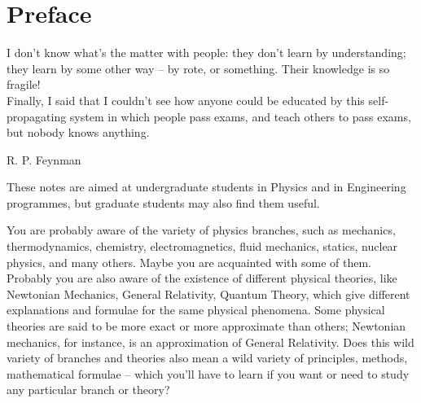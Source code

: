 \documentclass[a4paper,12pt,%
onecolumn,oneside,%
british%
]{memoir}
\newcommand{\addchap}[1]{\chapter*[#1]{#1}\addcontentsline{toc}{chapter}{#1}}
\renewcommand*{\|}[1][]{\nonscript\:#1\vert\nonscript\:\mathopen{}}
\begin{document}
\setlength{\epigraphwidth}{0.67\linewidth}
\epigraphfontsize{\footnotesize}
\setlength{\epigraphrule}{0pt}




\clearpage
{}
\tableofcontents*
\label{sec:toc}

\setcounter{chapter}{-1}


\printpagenotes*
\clearpage
\addchap{Preface}
\label{cha:preface}

\epigraph{I don't know what's the matter with people: they don't learn by understanding; they learn by some other way -- by rote, or something. Their knowledge is so fragile!\\[2\jot]
  Finally, I said that I couldn't see how anyone could be educated by this self-propagating system in which people pass exams, and teach others to pass exams, but nobody knows anything.}{R. P. Feynman \cites*{feynman1985_r1989}}

These notes are aimed at undergraduate students in Physics and in Engineering programmes, but graduate students may also find them useful.

You are probably aware of the variety of physics branches, such as mechanics, thermodynamics, chemistry, electromagnetics, fluid mechanics, statics, nuclear physics, and many others. Maybe you are acquainted with some of them. Probably you are also aware of the existence of different physical theories, like Newtonian Mechanics, General Relativity, Quantum Theory, which give different explanations and formulae for the same physical phenomena. Some physical theories are said to be more exact or more approximate than others; Newtonian mechanics, for instance, is an approximation of General Relativity. Does this wild variety of branches and theories also mean a wild variety of principles, methods, mathematical formulae -- which you'll have to learn if you want or need to study any particular branch or theory?
\end{document}
